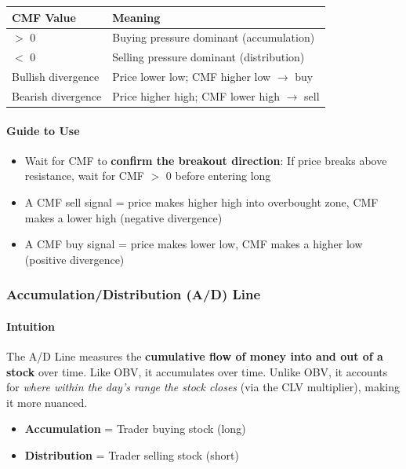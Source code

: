 \documentclass[12pt,openany]{book}
\begin{document}
\begin{center}
\small
\renewcommand{\arraystretch}{1.2}
\begin{tabular}{|L{0.30\textwidth}|L{0.60\textwidth}|}
\hline
 \textbf{CMF Value} & \textbf{Meaning} \\ \hline
 \(>\) 0 & Buying pressure dominant (accumulation) \\ \hline
 \(<\) 0 & Selling pressure dominant (distribution) \\ \hline
 Bullish divergence & Price lower low; CMF higher low \(\rightarrow\) buy \\ \hline
 Bearish divergence & Price higher high; CMF lower high \(\rightarrow\) sell \\ \hline
\end{tabular}
\end{center}

\paragraph{Guide to Use}
\begin{itemize}[leftmargin=*]
    \item Wait for CMF to \textbf{confirm the breakout direction}: If price breaks above resistance, wait for CMF \(>\) 0 before entering long
    \item A CMF sell signal = price makes higher high into overbought zone, CMF makes a lower high (negative divergence)
    \item A CMF buy signal = price makes lower low, CMF makes a higher low (positive divergence)
\end{itemize}

\subsubsection{Accumulation/Distribution (A/D) Line}

\paragraph{Intuition}
The A/D Line measures the \textbf{cumulative flow of money into and out of a stock} over time. Like OBV, it accumulates over time. Unlike OBV, it accounts for \emph{where within the day's range the stock closes} (via the CLV multiplier), making it more nuanced.

\begin{itemize}[leftmargin=*]
    \item \textbf{Accumulation} = Trader buying stock (long)
    \item \textbf{Distribution} = Trader selling stock (short)
\end{itemize}
\end{document}
